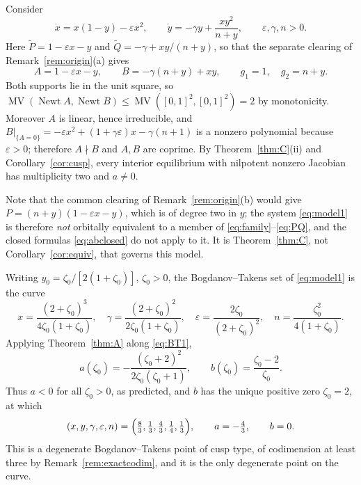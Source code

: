 \documentclass[12pt]{article}
\theoremstyle{plain}
\theoremstyle{definition}
\theoremstyle{remark}
\DeclareMathOperator{\MV}{MV}
\DeclareMathOperator{\Newt}{Newt}
\begin{document}
	Consider
	\begin{equation}\label{eq:model1}
		\dot x = x(1-y)-\varepsilon x^{2},
		\qquad
		\dot y = -\gamma y+\frac{xy^{2}}{n+y},
		\qquad \varepsilon,\gamma,n>0 .
	\end{equation}
	Here $\widetilde P=1-\varepsilon x-y$ and
	$\widetilde Q=-\gamma+xy/(n+y)$, so that the separate clearing of
	Remark~\ref{rem:origin}(a) gives
	\begin{equation}\label{eq:AB1}
		A=1-\varepsilon x-y,\qquad B=-\gamma(n+y)+xy,
		\qquad g_{1}=1,\quad g_{2}=n+y .
	\end{equation}
	Both supports lie in the unit square, so
	$\MV(\Newt A,\Newt B)\le\MV([0,1]^{2},[0,1]^{2})=2$ by monotonicity.
	Moreover $A$ is linear, hence irreducible, and
	$B|_{\{A=0\}}=-\varepsilon x^{2}+(1+\gamma\varepsilon)x-\gamma(n+1)$
	is a nonzero polynomial because $\varepsilon>0$; therefore $A\nmid B$
	and $A,B$ are coprime.  By Theorem~\ref{thm:C}(ii) and
	Corollary~\ref{cor:cusp}, every interior equilibrium with nilpotent
	nonzero Jacobian has multiplicity two and $a\neq0$.
	
	Note that the common clearing of Remark~\ref{rem:origin}(b) would give
	$P=(n+y)(1-\varepsilon x-y)$, which is of degree two in $y$; the system
	\eqref{eq:model1} is therefore \emph{not} orbitally equivalent to a
	member of \eqref{eq:family}--\eqref{eq:PQ}, and the closed formulas
	\eqref{eq:abclosed} do not apply to it.  It is Theorem~\ref{thm:C},
	not Corollary~\ref{cor:equiv}, that governs this model.
	
	Writing $y_{0}=\zeta_{0}/[2(1+\zeta_{0})]$, $\zeta_{0}>0$, the
	Bogdanov--Takens set of \eqref{eq:model1} is the curve
	\begin{equation}\label{eq:BT1}
		x=\frac{(2+\zeta_{0})^{3}}{4\zeta_{0}(1+\zeta_{0})},
		\quad
		\gamma=\frac{(2+\zeta_{0})^{2}}{2\zeta_{0}(1+\zeta_{0})},
		\quad
		\varepsilon=\frac{2\zeta_{0}}{(2+\zeta_{0})^{2}},
		\quad
		n=\frac{\zeta_{0}^{2}}{4(1+\zeta_{0})} .
	\end{equation}
	Applying Theorem~\ref{thm:A} along \eqref{eq:BT1},
	\begin{equation}\label{eq:ab1}
		a(\zeta_{0})=-\frac{(\zeta_{0}+2)^{2}}{2\zeta_{0}(\zeta_{0}+1)},
		\qquad
		b(\zeta_{0})=\frac{\zeta_{0}-2}{\zeta_{0}} .
	\end{equation}
	Thus $a<0$ for all $\zeta_{0}>0$, as predicted, and $b$ has the unique
	positive zero $\zeta_{0}=2$, at which
	\[
	(x,y,\gamma,\varepsilon,n)=
	\Bigl(\tfrac83,\tfrac13,\tfrac43,\tfrac14,\tfrac13\Bigr),
	\qquad a=-\tfrac43,\qquad b=0 .
	\]
	This is a degenerate Bogdanov--Takens point of cusp type, of
	codimension at least three by Remark~\ref{rem:exactcodim}, and it is
	the only degenerate point on the curve.
	
\end{document}
